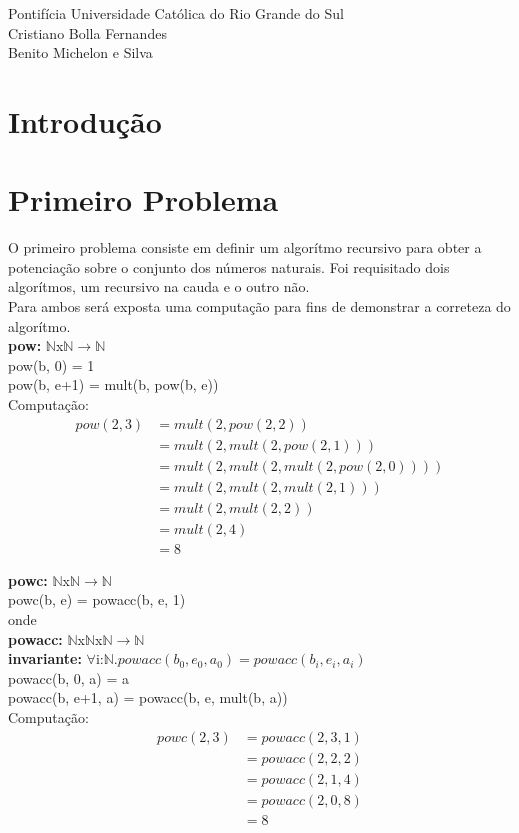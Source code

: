 \documentclass{article}
\begin{document}
\begin{center}
Pontifícia Universidade Católica do Rio Grande do Sul\\
Cristiano Bolla Fernandes\\
Benito Michelon e Silva
\end{center}
\section{Introdução}

\section{Primeiro Problema}
O primeiro problema consiste em definir um algorítmo recursivo para obter a potenciação sobre o conjunto dos números naturais.
Foi requisitado dois algorítmos, um recursivo na cauda e o outro não.\\
Para ambos será exposta uma computação para fins de demonstrar a correteza do algorítmo.\\
\textbf{pow:} $\mathbb{N}$x$\mathbb{N}$$\rightarrow \mathbb{N}$\\
pow(b, 0) = 1\\
pow(b, e+1) = mult(b, pow(b, e))\\

Computação:\\
\begin{align*}
pow(2,3) &= mult(2, pow(2, 2))\\
&= mult(2, mult(2, pow(2, 1)))\\
&= mult(2, mult(2, mult(2, pow(2, 0))))\\
&= mult(2, mult(2, mult(2, 1)))\\
&= mult(2, mult(2, 2))\\
&= mult(2, 4)\\
&= 8
\end{align*}

\noindent \textbf{powc:} $\mathbb{N}$x$\mathbb{N}$$\rightarrow \mathbb{N}$\\
powc(b, e) = powacc(b, e, 1)\\
onde\\
\indent \textbf{powacc:} $\mathbb{N}$x$\mathbb{N}$x$\mathbb{N}$$\rightarrow \mathbb{N}$\\
\indent \textbf{invariante:} $\forall$i:$\mathbb{N}.powacc(b_0,e_0, a_0) = powacc(b_i, e_i, a_i)$\\
\indent powacc(b, 0, a) = a\\
\indent powacc(b, e+1, a) = powacc(b, e, mult(b, a))\\

Computação:\\
\begin{align*}
powc(2, 3) &= powacc(2, 3, 1)\\
&= powacc(2, 2, 2)\\
&= powacc(2, 1, 4)\\
&= powacc(2, 0, 8)\\
&= 8
\end{align*}
\end{document}
